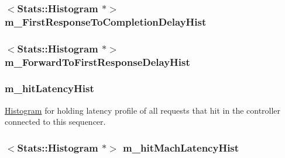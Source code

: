 \label{classSequencer_a4760ee57ee761ad53400a617eb12e95a}
\hypertarget{classSequencer_a6236c49462f2162310ca62569ec869ac}{
\subsubsection[{m\_\-FirstResponseToCompletionDelayHist}]{$<${\bf Stats::Histogram} $\ast$$>$ {\bf m\_\-FirstResponseToCompletionDelayHist}}}
\label{classSequencer_a6236c49462f2162310ca62569ec869ac}
\hypertarget{classSequencer_ae9bea11c9b001a155e7f7a0f39ac7bf9}{
\subsubsection[{m\_\-ForwardToFirstResponseDelayHist}]{$<${\bf Stats::Histogram} $\ast$$>$ {\bf m\_\-ForwardToFirstResponseDelayHist}}}
\label{classSequencer_ae9bea11c9b001a155e7f7a0f39ac7bf9}
\hypertarget{classSequencer_aa7b4f1cb2f6f69fac85f5fa0be12f95a}{
\subsubsection[{m\_\-hitLatencyHist}]{ {\bf m\_\-hitLatencyHist}}}
\label{classSequencer_aa7b4f1cb2f6f69fac85f5fa0be12f95a}
\hyperlink{classHistogram}{Histogram} for holding latency profile of all requests that hit in the controller connected to this sequencer. \hypertarget{classSequencer_add8e2c73ddfe42f1b177e641a0e626d5}{
\subsubsection[{m\_\-hitMachLatencyHist}]{$<${\bf Stats::Histogram} $\ast$$>$ {\bf m\_\-hitMachLatencyHist}}}
